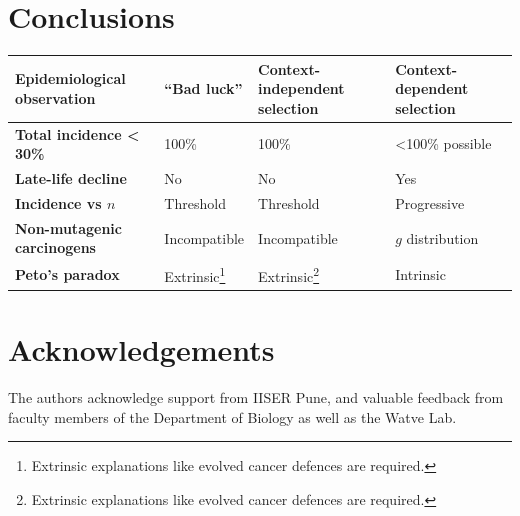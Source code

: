 \documentclass[a0,landscape]{a0poster}
\begin{document}
\begin{multicols}{3}
		\section{Conclusions}
		\begin{table}[H]
		\centering
			\begin{tabular}{p{.3\linewidth}|p{.2\linewidth}p{.25\linewidth}p{.225\linewidth}}
			\textbf{Epidemiological observation} & ``Bad luck'' & Context-independent selection & Context-dependent selection \\
			\hline
			\textbf{Total incidence < 30\%} & 100\% & 100\% & <100\% possible \\
			\textbf{Late-life decline} & No & No & Yes \\
			\textbf{Incidence vs $n$} & Threshold & Threshold & Progressive \\
			\textbf{Non-mutagenic carcinogens} & Incompatible & Incompatible & $g$ distribution \\
			\textbf{Peto's paradox} & Extrinsic\footnote[1]{Extrinsic explanations like evolved cancer defences are required.} & Extrinsic\footnote[1]{Extrinsic explanations like evolved cancer defences are required.} & Intrinsic \\
			\end{tabular}
		\end{table}
		\setlength{\fboxsep}{12pt}

		\begin{minipage}{.5\linewidth}
		\renewcommand*{\bibfont}{\tiny}
		\printbibliography
		\end{minipage}
		\hspace{0.01\linewidth}
		\begin{minipage}{.5\linewidth}
		\tiny
		\section*{Acknowledgements}
		The authors acknowledge support from IISER Pune, and valuable feedback from faculty members of the Department of Biology as well as the Watve Lab.
		\end{minipage}
	
	
	

\end{multicols}
\end{document}
